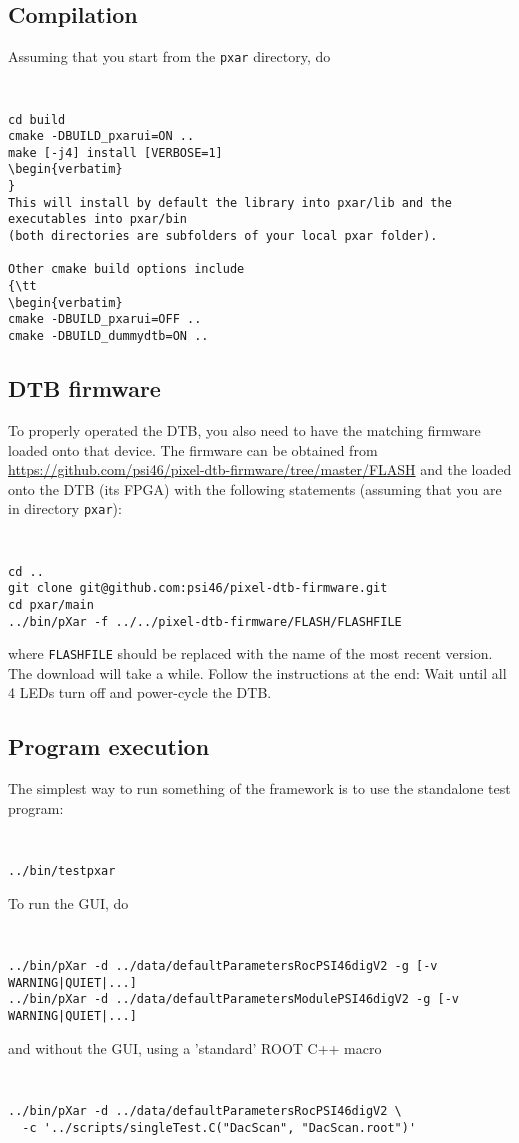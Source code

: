 \subsection{Compilation}
\label{ss:compilation}
Assuming that you start from the {\tt pxar} directory, do
{\tt
\begin{verbatim}
cd build
cmake -DBUILD_pxarui=ON ..
make [-j4] install [VERBOSE=1]
\begin{verbatim}
}
This will install by default the library into pxar/lib and the
executables into pxar/bin 
(both directories are subfolders of your local pxar folder).

Other cmake build options include
{\tt
\begin{verbatim}
cmake -DBUILD_pxarui=OFF ..
cmake -DBUILD_dummydtb=ON ..
\end{verbatim}
}

\subsection{DTB firmware}
\label{ss:firmware}


To properly operated the DTB, you also need to have the matching
firmware loaded onto that device. The firmware can be obtained from 
\url{https://github.com/psi46/pixel-dtb-firmware/tree/master/FLASH} and the loaded
onto the DTB (its FPGA) with the following statements (assuming that
you are in directory {\tt pxar}): 
{\tt
\begin{verbatim}
cd ..
git clone git@github.com:psi46/pixel-dtb-firmware.git
cd pxar/main
../bin/pXar -f ../../pixel-dtb-firmware/FLASH/FLASHFILE
\end{verbatim}
} 
where {\tt FLASHFILE} should be replaced with the name of the most
recent version. The download will take a while. Follow the
instructions at the end: Wait until all 4 LEDs turn off and
power-cycle the DTB.

\subsection{Program execution}
\label{ss:run}
The simplest way to run something of the \pxar framework is to use the
standalone test program: 
{\tt
\begin{verbatim}
../bin/testpxar
\end{verbatim}
}

To run the GUI, do 
{\tt
\begin{verbatim}
../bin/pXar -d ../data/defaultParametersRocPSI46digV2 -g [-v WARNING|QUIET|...]
../bin/pXar -d ../data/defaultParametersModulePSI46digV2 -g [-v WARNING|QUIET|...]
\end{verbatim}
}

and without the GUI, using a 'standard' ROOT C++ macro
{\tt
\begin{verbatim}
../bin/pXar -d ../data/defaultParametersRocPSI46digV2 \
  -c '../scripts/singleTest.C("DacScan", "DacScan.root")'
\end{verbatim}
}
